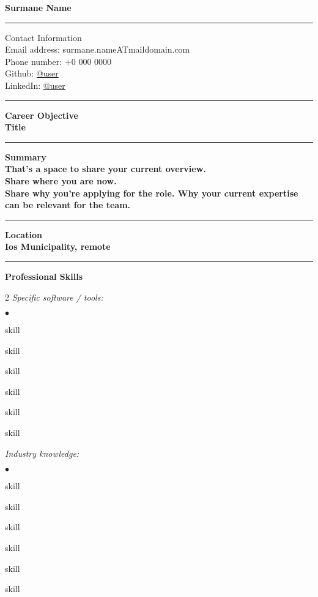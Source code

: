 \documentclass[oneside,final,12pt]{extreport}
\newenvironment{compactlist}{
	\begin{list}{{$\bullet$}}{
		\setlength\leftmargin{0.4cm}
		\setlength\partopsep{0pt}
		\setlength\parskip{0pt}
		\setlength\parsep{0pt}
		\setlength\topsep{0pt}
		\setlength\itemsep{0pt}
	}
}{
	\end{list}
}
\begin{document}
\bfseries
Surmane Name \\
\rule{\textwidth}{0.4pt}
Contact Information \\
\noindent
\mdseries
Email address: 
surmane.nameATmaildomain.com \\
Phone number: 
+0 000 0000 \\
Github:
\href{https://github.com/user}{@user} \\
LinkedIn:
\href{https://www.linkedin.com/in/username}{@user} \\
\rule{\textwidth}{0.4pt}

\bfseries
Career Objective \\
\mdseries
Title \\
\rule{\textwidth}{0.4pt}

\bfseries
Summary \\
\mdseries
That's a space to share your current overview. \\
Share where you are now. \\[5pt]
Share why you're applying for the role. Why your current expertise can be relevant for the team. \\
\rule{\textwidth}{0.4pt}

\bfseries
Location \\
\mdseries
Ios Municipality, remote \\
\rule{\textwidth}{0.4pt}

\bfseries
Professional Skills
\mdseries
\begin{multicols}{2}
\textsl{Specific software / tools:}
	\begin{compactlist}
		\item skill
		\item skill
		\item skill
		\item skill
		\item skill
		\item skill
	\end{compactlist}
\textsl{Industry knowledge:}
	\begin{compactlist}
		\item skill
		\item skill
		\item skill
		\item skill
		\item skill
		\item skill
	\end{compactlist}
\end{multicols}
\end{document}
